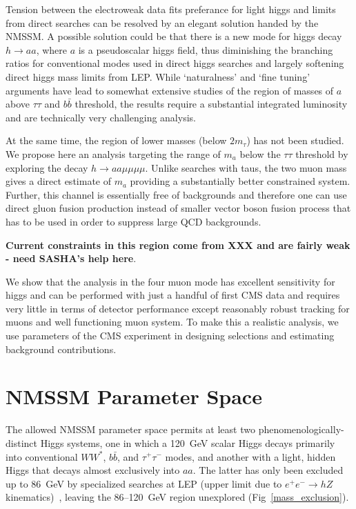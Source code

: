 \documentclass[aps,prd,onecolumn,superscriptaddress,showpacs]{revtex4}
\begin{document}
Tension between the electroweak data fits preferance for light higgs and limits
from direct searches can be resolved by an elegant solution handed by the NMSSM. 
A possible solution could be that there is a new mode for higgs decay $h \to aa$,
where $a$ is a pseudoscalar higgs field, thus diminishing the branching ratios for
conventional modes used in direct higgs searches and largely softening direct higgs
mass limits from LEP. While `naturalness' and `fine tuning' arguments have lead to
somewhat extensive studies of the region of masses of $a$ above $\tau \tau$ and $b\bar{b}$ 
threshold, the results require a substantial integrated luminosity and are technically
very challenging analysis. 

At the same time, the region of lower masses (below $2 m_\tau$) has not been studied. We 
propose here an analysis targeting the range of $m_a$ below the $\tau \tau$ threshold by 
exploring the decay $h \to aa \mu \mu \mu \mu$. Unlike searches with taus, the two muon mass
gives a direct estimate of $m_a$ providing a substantially better constrained system. 
Further, this channel is essentially free of backgrounds and therefore one can use
direct gluon fusion production instead of smaller vector boson fusion process that has
to be used in order to suppress large QCD backgrounds. 

{\bf Current constraints in this region come from XXX and are fairly weak - need SASHA's help here}.

We show that the analysis in
the four muon mode has excellent sensitivity for higgs and can be performed with just 
a handful of first CMS data and requires very little in terms of detector performance 
except reasonably robust tracking for muons and well functioning muon system. To make 
this a realistic analysis, we use parameters of the CMS experiment in designing
selections and estimating background contributions.


\section{NMSSM Parameter Space}

The allowed NMSSM parameter space permits at least two
phenomenologically-distinct Higgs systems, one in which a 120~GeV
scalar Higgs decays primarily into conventional $WW^*$, $b\bar{b}$,
and $\tau^+\tau^-$ modes, and another with a light, hidden Higgs that decays
almost exclusively into $aa$.  The latter has only been excluded up to
86~GeV by specialized searches at LEP (upper limit due to $e^+e^- \to
h Z$ kinematics)~\cite{lep1exclusion,lep2exclusion}, leaving the
86--120~GeV region unexplored (Fig~\ref{mass_exclusion}).
\end{document}
